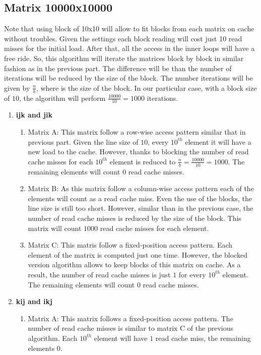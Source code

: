 \documentclass[10pt]{scrartcl}
\begin{document}
\subsection{Matrix 10000x10000}
Note that using block of 10x10 will allow to fit blocks from each matrix on cache without troubles.  Given the settings each block reading will cost just 10 read misses for the initial load.  After that, all the access in the inner loops will have a free ride.  So, this algorithm will iterate the matrices block by block in similar fashion as in the previous part.  The difference will be than the number of iterations will be reduced by the size of the block.  The number iterations will be given by $\frac{n}{b}$, where is the size of the block.  In our particular case, with a block size of $10$, the algorithm will perform $\frac{10000}{10}=1000$ iterations.
\begin{enumerate}
 \item \textbf{ijk and jik}
 \begin{enumerate}
  \item Matrix A: This matrix follow a row-wise access pattern similar that in previous part. Given the line size of $10$, every $10^{th}$ element it will have a new load to the cache.  However, thanks to blocking the number of read cache misses for each $10^{th}$ element is reduced to $\frac{n}{b}=\frac{10000}{10}=1000$. The remaining elements will count $0$ read cache misses. 
  \item Matrix B: As this matrix follow a column-wise access pattern each of the elements will count as a read cache miss.  Even the use of the blocks, the line size is still too short.  However, similar than in the previous case, the number of read cache misses is reduced by the size of the block.  This matrix will count $1000$ read cache misses for each element.
  \item Matrix C: This matris follow a fixed-position access pattern.  Each element of the matrix is computed just one time.  However, the blocked version algorithm allows to keep blocks of this matrix on cache.  As a result, the number of read cache misses is just $1$ for every $10^{th}$ element.  The remaining elements will count $0$ read cache misses.  
 \end{enumerate}
 \item \textbf{kij and ikj}
 \begin{enumerate}
  \item Matrix A: This matrix follows a fixed-position access pattern.  The number of read cache misses is similar to matrix C of the previous algorithm. Each $10^{th}$ element will have $1$ read cache miss, the remaining elements $0$.

\end{enumerate}
\end{enumerate}
\end{document}
